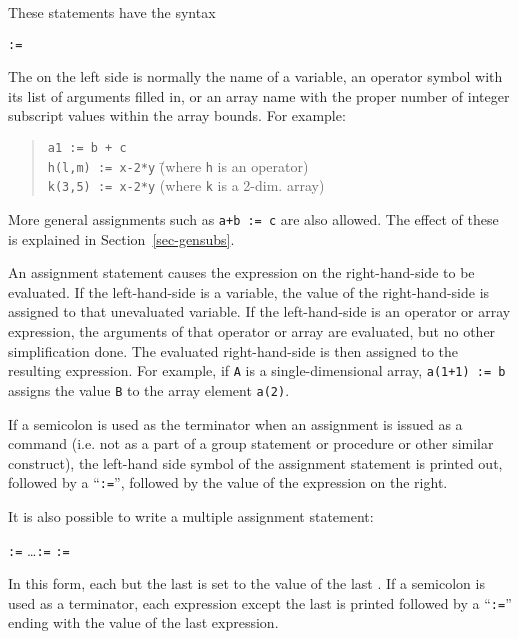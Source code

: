 \label{reserved:assignop}

These statements have the syntax
\begin{syntax}
     \bnfprod {} \texttt{:=} 
\end{syntax}
The  on the left side is normally the name of a variable, an
operator symbol with its list of arguments filled in, or an array name with
the proper number of integer subscript values within the array bounds. For
example:
\begin{quote}
\begin{tabbing}
\texttt{a1 := b + c} \\
\texttt{h(l,m) := x-2*y} \hspace{1in} \= (where \texttt{h} is an operator) \\
\texttt{k(3,5) := x-2*y} \> (where \texttt{k} is a 2-dim. array)
\end{tabbing}
\end{quote}
More general assignments such as \texttt{a+b := c} are also
allowed.  The effect of these is explained in Section~\ref{sec-gensubs}.

An assignment statement causes the expression on the right-hand-side to be
evaluated.  If the left-hand-side is a variable, the value of the
right-hand-side is assigned to that unevaluated variable.  If the
left-hand-side is an operator or array expression, the arguments of that
operator or array are evaluated, but no other simplification done.  The
evaluated right-hand-side is then assigned to the resulting expression.
For example, if \texttt{A} is a single-dimensional array, \texttt{a(1+1) := b}
assigns the value \texttt{B} to the array element \texttt{a(2)}.

If a semicolon is used as the terminator when an assignment
 is issued as a command (i.e. not as a part of a group
statement or procedure or other similar construct), the left-hand side
symbol of the assignment statement is printed out, followed by a
``\texttt{:=}'', followed by the value of the expression on the right.

It is also possible to write a multiple assignment statement:
\begin{syntax}
     \texttt{:=} \dots \texttt{:=}  \texttt{:=} 
\end{syntax}
In this form, each  but the last is set to the value of
the last .  If a semicolon is used as a terminator, each
expression except the last is printed followed by a ``\texttt{:=}'' ending
with the value of the last expression.


